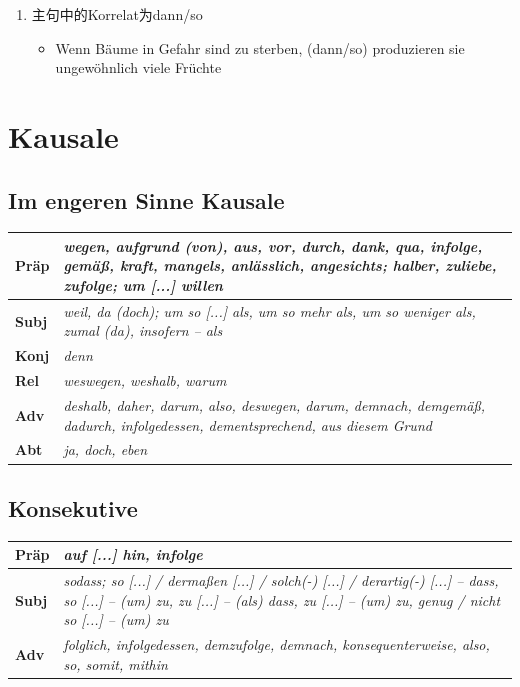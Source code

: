 \documentclass[UTF8]{report}
\begin{document}
\begin{enumerate}
    \item 主句中的Korrelat为dann/so
    \begin{itemize}
        \item Wenn Bäume in Gefahr sind zu sterben, (dann/so) produzieren sie ungewöhnlich viele Früchte
    \end{itemize}
\end{enumerate}

\section{Kausale}

\subsection{Im engeren Sinne Kausale}
\begin{longtable}{|>{\raggedright\arraybackslash}p{1cm}|>{\raggedright\arraybackslash}p{12cm}|}

\hline
\textbf{Präp} & \textit{wegen, aufgrund (von), aus, vor, durch, dank, qua, infolge, gemäß, kraft, mangels, anlässlich, angesichts; halber, zuliebe, zufolge; um [...] willen} \\
\hline
\textbf{Subj} & \textit{weil, da (doch); um so [...] als, um so mehr als, um so weniger als, zumal (da), insofern -- als} \\
\hline
\textbf{Konj} & \textit{denn} \\
\hline
\textbf{Rel} & \textit{weswegen, weshalb, warum} \\
\hline
\textbf{Adv} & \textit{deshalb, daher, darum, also, deswegen, darum, demnach, demgemäß, dadurch, infolgedessen, dementsprechend, aus diesem Grund} \\
\hline
\textbf{Abt} & \textit{ja, doch, eben} \\
\hline
\end{longtable}


\subsection{Konsekutive}
\begin{longtable}{|>{\raggedright\arraybackslash}p{1cm}|>{\raggedright\arraybackslash}p{12cm}|}

\hline
\textbf{Präp} & \textit{auf [...] hin, infolge} \\
\hline
\textbf{Subj} & \textit{sodass; so [...] / dermaßen [...] / solch(-) [...] / derartig(-) [...] -- dass, so [...] -- (um) zu, zu [...] -- (als) dass, zu [...] -- (um) zu, genug / nicht so [...] -- (um) zu} \\
\hline
\textbf{Adv} & \textit{folglich, infolgedessen, demzufolge, demnach, konsequenterweise, also, so, somit, mithin} \\
\hline

\end{longtable}
\end{document}
